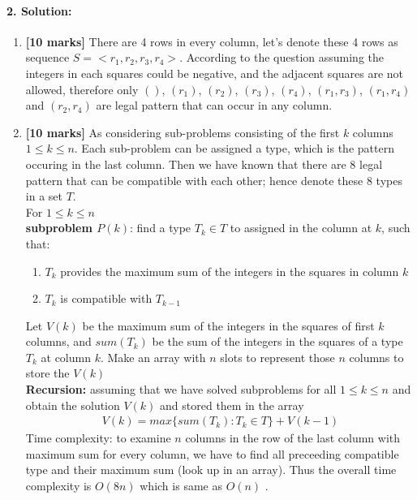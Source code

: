 \documentclass[a4paper]{scrartcl}
\begin{document}
\paragraph{2. Solution:}
\label{sec:Question 2}
\begin{enumerate}[label=(\alph*)]
  \item {\bfseries[10 marks]} There are 4 rows in every column, let's denote these 4 rows as sequence $S=\big<r_1,r_2,r_3,r_4\big>$.
  According to the question assuming the integers in each squares could be negative, and the adjacent squares are not allowed, therefore only $()$, $(r_1)$, $(r_2)$, $(r_3)$, $(r_4)$, $(r_1, r_3)$, $(r_1, r_4)$ and $(r_2, r_4)$ are legal pattern that can occur in any column. \\
  \item {\bfseries[10 marks]} As considering sub-problems consisting of the first $k$ columns $1\leq k \leq n$. Each sub-problem can be assigned a type, which is the pattern occuring in the last column. Then we have known that there are 8 legal pattern that can be compatible with each other; hence denote these 8 types in a set $T$. \\
  For $1\leq k \leq n$\\
  \textbf{subproblem $P(k)$}: find a type $T_k \in T$ to assigned in the column at $k$, such that:
  \begin{enumerate}[label=(\arabic{*})]
    \item $T_k$ provides the maximum sum of the integers in the squares in column $k$
    \item $T_k$ is compatible with $T_{k-1}$
  \end{enumerate}
  Let $V(k)$ be the maximum sum of the integers in the squares of first $k$ columns, and $sum(T_k)$ be the sum of the integers in the squares of a type $T_k$ at column $k$.
  Make an array with $n$ slots to represent those $n$ columns to store the $V(k)$\\
\textbf{Recursion:} assuming that we have solved subproblems for all $1\leq k \leq n$ and obtain the solution $V(k)$ and stored them in the array
\begin{align*}
  V(k)=  max\{ sum(T_k) : T_k \in T \} +V(k-1)
\end{align*}
Time complexity: to examine $n$ columns in the row of the last column with maximum sum for every
column, we have to find all preceeding compatible type and their maximum sum (look up in an array). Thus the overall time complexity is $O(8n)$ which is same as $O(n)$ .
\end{enumerate}
\end{document}
